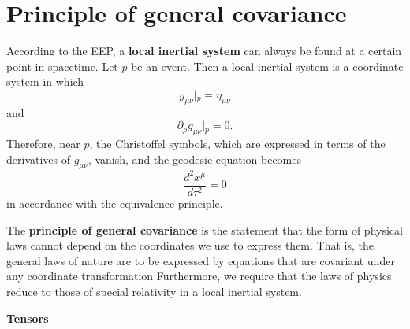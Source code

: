 \documentclass[11pt]{article}
\begin{document}
\section{Principle of general covariance}

According to the EEP, a \textbf{local inertial system} can always be found at a certain point in spacetime.
Let $p$ be an event.
Then a local inertial system is a coordinate system in which
$$ g_{\mu \nu} |{}_p = \eta_{\mu \nu} $$
and
$$ \partial_\rho g_{\mu \nu}|{}_p = 0. $$
Therefore, near $p$, the Christoffel symbols, which are expressed in terms of the derivatives of $g_{\mu \nu}$, vanish, and the geodesic equation becomes
$$ \frac{d^2 x^\mu}{d\tau^2} = 0 $$
in accordance with the equivalence principle.

The \textbf{principle of general covariance} is the statement that the form of physical laws cannot depend on the coordinates we use to express them. 
That is, the general laws of nature are to be expressed by equations that are covariant under any coordinate transformation
Furthermore, we require that the laws of physics reduce to those of special relativity in a local inertial system.

\textbf{Tensors}
\end{document}
